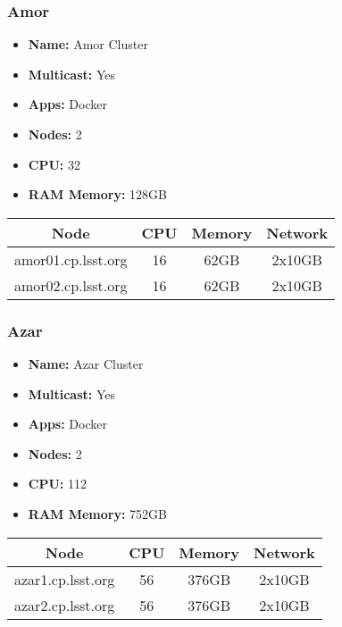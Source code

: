 \subsubsection{Amor}
\begin{itemize}
  \itemsep0em 
  \item \textbf{Name:}       Amor Cluster
  \item \textbf{Multicast:}  Yes
  \item \textbf{Apps:}       Docker
  \item \textbf{Nodes:}      2
  \item \textbf{CPU:}        32
  \item \textbf{RAM Memory:} 128GB
\end{itemize}
\begin{center}
  \small
  \begin{tabular}{||c c c c||}
    \hline
    \textbf{Node} & \textbf{CPU} & \textbf{Memory} & \textbf{Network} \\ [0.5ex]
    \hline
    amor01.cp.lsst.org & 16 & 62GB & 2x10GB \\
    \hline
    amor02.cp.lsst.org & 16 & 62GB & 2x10GB \\
    \hline
  \end{tabular}
\end{center}

\subsubsection{Azar}
\begin{itemize}
  \itemsep0em 
  \item \textbf{Name:}       Azar Cluster
  \item \textbf{Multicast:}  Yes
  \item \textbf{Apps:}       Docker
  \item \textbf{Nodes:}      2
  \item \textbf{CPU:}        112
  \item \textbf{RAM Memory:} 752GB
\end{itemize}
\begin{center}
  \small
  \begin{tabular}{||c c c c||}
    \hline
    \textbf{Node} & \textbf{CPU} & \textbf{Memory} & \textbf{Network} \\ [0.5ex]
    \hline
    azar1.cp.lsst.org & 56 & 376GB & 2x10GB \\
    \hline
    azar2.cp.lsst.org & 56 & 376GB & 2x10GB \\
    \hline
  \end{tabular}
\end{center}

